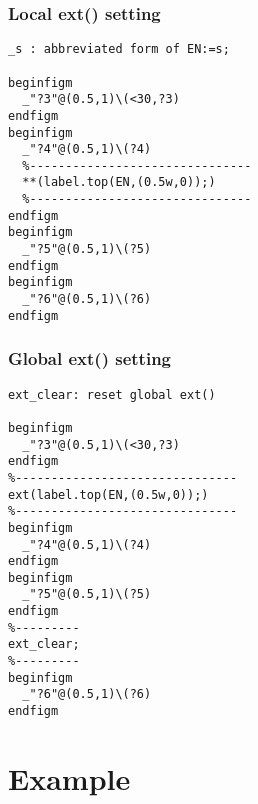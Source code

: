\documentclass[a4paper]{article}
\begin{document}
\subsubsection{Local ext() setting}
\index{\_}%
\begin{verbatim}
_s : abbreviated form of EN:=s;

beginfigm
  _"?3"@(0.5,1)\(<30,?3)
endfigm
beginfigm
  _"?4"@(0.5,1)\(?4)
  %-------------------------------
  **(label.top(EN,(0.5w,0));)
  %-------------------------------
endfigm
beginfigm
  _"?5"@(0.5,1)\(?5)
endfigm
beginfigm
  _"?6"@(0.5,1)\(?6)
endfigm
\end{verbatim}
\quad
{}
\subsubsection{Global ext() setting}
%
\begin{verbatim}
ext_clear: reset global ext()

beginfigm
  _"?3"@(0.5,1)\(<30,?3)
endfigm
%-------------------------------
ext(label.top(EN,(0.5w,0));)
%-------------------------------
beginfigm
  _"?4"@(0.5,1)\(?4)
endfigm
beginfigm
  _"?5"@(0.5,1)\(?5)
endfigm
%---------
ext_clear;
%---------
beginfigm
  _"?6"@(0.5,1)\(?6)
endfigm
\end{verbatim}
\quad
{}
\newpage
\onecolumn
\section{Example}
\end{document}
